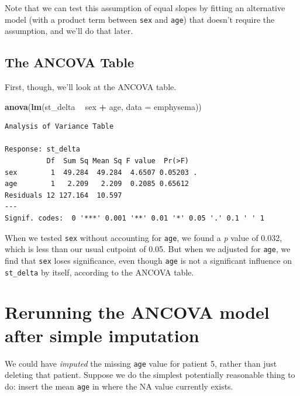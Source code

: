 \documentclass[]{book}
\newenvironment{Shaded}{\begin{snugshade}}{\end{snugshade}}
\newcommand{\KeywordTok}[1]{\textcolor[rgb]{0.13,0.29,0.53}{\textbf{#1}}}
\newcommand{\DataTypeTok}[1]{\textcolor[rgb]{0.13,0.29,0.53}{#1}}
\newcommand{\StringTok}[1]{\textcolor[rgb]{0.31,0.60,0.02}{#1}}
\newcommand{\OtherTok}[1]{\textcolor[rgb]{0.56,0.35,0.01}{#1}}
\newcommand{\OperatorTok}[1]{\textcolor[rgb]{0.81,0.36,0.00}{\textbf{#1}}}
\newcommand{\NormalTok}[1]{#1}
\theoremstyle{definition}
\theoremstyle{definition}
\theoremstyle{definition}
\theoremstyle{remark}
\begin{document}
Note that we can test this assumption of equal slopes by fitting an
alternative model (with a product term between \texttt{sex} and
\texttt{age}) that doesn't require the assumption, and we'll do that
later.

\subsection{The ANCOVA Table}\label{the-ancova-table}

First, though, we'll look at the ANCOVA table.

\begin{Shaded}
\begin{Highlighting}[]
\KeywordTok{anova}\NormalTok{(}\KeywordTok{lm}\NormalTok{(st_delta }\OperatorTok{~}\StringTok{ }\NormalTok{sex }\OperatorTok{+}\StringTok{ }\NormalTok{age, }\DataTypeTok{data =}\NormalTok{ emphysema))}
\end{Highlighting}
\end{Shaded}

\begin{verbatim}
Analysis of Variance Table

Response: st_delta
          Df  Sum Sq Mean Sq F value  Pr(>F)  
sex        1  49.284  49.284  4.6507 0.05203 .
age        1   2.209   2.209  0.2085 0.65612  
Residuals 12 127.164  10.597                  
---
Signif. codes:  0 '***' 0.001 '**' 0.01 '*' 0.05 '.' 0.1 ' ' 1
\end{verbatim}

When we tested \texttt{sex} without accounting for \texttt{age}, we
found a \emph{p} value of 0.032, which is less than our usual cutpoint
of 0.05. But when we adjusted for \texttt{age}, we find that
\texttt{sex} loses significance, even though \texttt{age} is not a
significant influence on \texttt{st\_delta} by itself, according to the
ANCOVA table.

\section{Rerunning the ANCOVA model after simple
imputation}\label{rerunning-the-ancova-model-after-simple-imputation}

We could have \emph{imputed} the missing \texttt{age} value for patient
5, rather than just deleting that patient. Suppose we do the simplest
potentially reasonable thing to do: insert the mean \texttt{age} in
where the NA value currently exists.

\begin{Shaded}
\end{Shaded}
\end{document}
